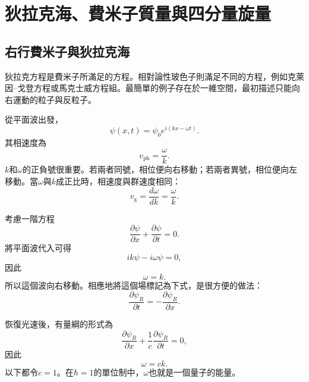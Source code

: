 \chapter{狄拉克海、費米子質量與四分量旋量}

\section{右行費米子與狄拉克海}

狄拉克方程是費米子所滿足的方程。相對論性玻色子則滿足不同的方程，例如克萊因--戈登方程或馬克士威方程組。最簡單的例子存在於一維空間，最初描述只能向右運動的粒子與反粒子。

從平面波出發，
\begin{equation}
\psi(x,t)=\psi_0 e^{i(kx-\omega t)}.
\end{equation}
其相速度為
\begin{equation}
v_{\mathrm{ph}}=\frac{\omega}{k}.
\end{equation}
\(k\)和\(\omega\)的正負號很重要。若兩者同號，相位便向右移動；若兩者異號，相位便向左移動。當\(\omega\)與\(k\)成正比時，相速度與群速度相同：
\begin{equation}
v_{\mathrm{g}}=\frac{d\omega}{dk}=\frac{\omega}{k}.
\end{equation}

考慮一階方程
\begin{equation}
\frac{\partial\psi}{\partial x}
+
\frac{\partial\psi}{\partial t}
=0.
\end{equation}
將平面波代入可得
\begin{equation}
ik\psi-i\omega\psi=0,
\end{equation}
因此
\begin{equation}
\omega=k.
\end{equation}
所以這個波向右移動。相應地將這個場標記為下式，是很方便的做法：
\begin{equation}
\frac{\partial\psi_R}{\partial t}
=
-\frac{\partial\psi_R}{\partial x}.
\end{equation}

恢復光速後，有量綱的形式為
\begin{equation}
\frac{\partial\psi_R}{\partial x}
+
\frac{1}{c}\frac{\partial\psi_R}{\partial t}
=0,
\end{equation}
因此
\begin{equation}
\omega=ck.
\end{equation}
以下都令\(c=1\)。在\(\hbar=1\)的單位制中，\(\omega\)也就是一個量子的能量。

